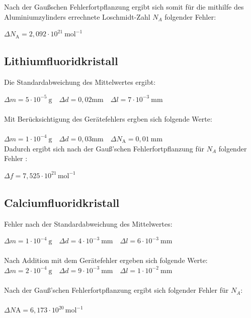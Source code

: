 \documentclass[12pt,a4paper,titlepage,headinclude,bibtotoc]{scrartcl}
\begin{document}
Nach der Gaußschen Fehlerfortpflanzung ergibt sich somit für die mithilfe des Aluminiumzylinders errechnete Loschmidt-Zahl $N_A$ folgender Fehler:\\

\vspace{3mm}

$\Delta N_\mathrm{A} = 2,092\cdot10^{21}\ \mathrm{mol^{-1}}$


\subsection{Lithiumfluoridkristall}

Die Standardabweichung des Mittelwertes ergibt:\\

\vspace{3mm}

$\Delta m = 5\cdot10^{-5} \ \mathrm{g} \quad \Delta d= 0,02  \mathrm{mm} \quad \Delta l = 7 \cdot 10^{-3}\ \mathrm{mm}$\\
\\
Mit Berücksichtigung des Gerätefehlers ergben sich folgende Werte:\\
\\
$\Delta m = 1\cdot10^{-4} \ \mathrm{g} \quad \Delta d= 0,03 \mathrm{mm} \quad \Delta N_\mathrm{A} = 0,01 \ \mathrm{mm}$\\

Dadurch ergibt sich nach der Gauß'schen Fehlerfortpflanzung für $N_A$ folgender Fehler :\\

\vspace{3mm}

$\Delta f= 7,525 \cdot 10^{21}\, \mathrm{mol^{-1}}$

\newpage

\subsection{Calciumfluoridkristall}

Fehler nach der Standardabweichung des Mittelwertes: 
\vspace{3mm}

$\Delta m = 1\cdot10^{-4} \ \mathrm{g} \quad \Delta d= 4 \cdot 10^{-3} \ \mathrm{mm} \quad \Delta l = 6 \cdot 10^{-3}\ \mathrm{mm}$\\
\\
Nach Addition mit dem Gerätefehler ergeben sich folgende Werte:
\\
$\Delta m = 2\cdot10^{-4} \ \mathrm{g} \quad \Delta d= 9 \cdot 10^{-3} \ \mathrm{mm} \quad \Delta l = 1 \cdot 10^{-2}\ \mathrm{mm}$\\
\\
Nach der Gauß'schen Fehlerfortpflanzung ergibt sich folgender Fehler für $N_A$:\\
\\
$\Delta N\mathrm{A} =6,173 \cdot 10^{20}\, \mathrm{mol^{-1}}$
\end{document}
